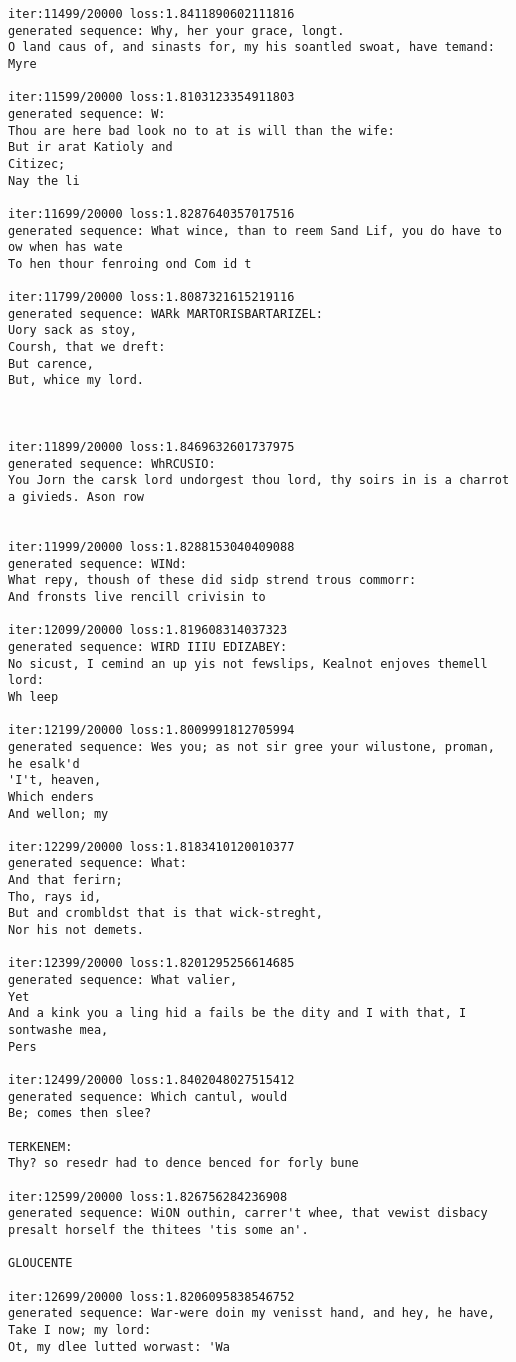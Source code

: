 \documentclass[11pt]{article}
\begin{document}
\begin{Verbatim}[commandchars=\\\{\}]
iter:11499/20000 loss:1.8411890602111816
generated sequence: Why, her your grace, longt.
O land caus of, and sinasts for, my his soantled swoat, have temand:
Myre

iter:11599/20000 loss:1.8103123354911803
generated sequence: W:
Thou are here bad look no to at is will than the wife:
But ir arat Katioly and
Citizec;
Nay the li

iter:11699/20000 loss:1.8287640357017516
generated sequence: What wince, than to reem Sand Lif, you do have to ow when has wate
To hen thour fenroing ond Com id t

iter:11799/20000 loss:1.8087321615219116
generated sequence: WARk MARTORISBARTARIZEL:
Uory sack as stoy,
Coursh, that we dreft:
But carence,
But, whice my lord.



iter:11899/20000 loss:1.8469632601737975
generated sequence: WhRCUSIO:
You Jorn the carsk lord undorgest thou lord, thy soirs in is a charrot a givieds. Ason row


iter:11999/20000 loss:1.8288153040409088
generated sequence: WINd:
What repy, thoush of these did sidp strend trous commorr:
And fronsts live rencill crivisin to 

iter:12099/20000 loss:1.819608314037323
generated sequence: WIRD IIIU EDIZABEY:
No sicust, I cemind an up yis not fewslips, Kealnot enjoves themell lord:
Wh leep

iter:12199/20000 loss:1.8009991812705994
generated sequence: Wes you; as not sir gree your wilustone, proman, he esalk'd
'I't, heaven,
Which enders
And wellon; my

iter:12299/20000 loss:1.8183410120010377
generated sequence: What:
And that ferirn;
Tho, rays id,
But and crombldst that is that wick-streght,
Nor his not demets.

iter:12399/20000 loss:1.8201295256614685
generated sequence: What valier,
Yet
And a kink you a ling hid a fails be the dity and I with that, I sontwashe mea,
Pers

iter:12499/20000 loss:1.8402048027515412
generated sequence: Which cantul, would
Be; comes then slee?

TERKENEM:
Thy? so resedr had to dence benced for forly bune

iter:12599/20000 loss:1.826756284236908
generated sequence: WiON outhin, carrer't whee, that vewist disbacy presalt horself the thitees 'tis some an'.

GLOUCENTE

iter:12699/20000 loss:1.8206095838546752
generated sequence: War-were doin my venisst hand, and hey, he have,
Take I now; my lord:
Ot, my dlee lutted worwast: 'Wa


\end{Verbatim}
\end{document}
